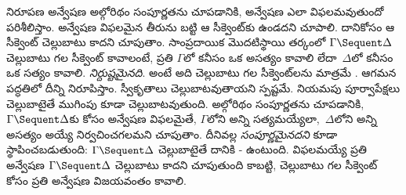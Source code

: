 \documentclass[../../../include/open-logic-section]{subfiles}
\begin{document}
నిరూపణ అన్వేషణ అల్గోరిథం సంపూర్ణతను చూపడానికి, అన్వేషణ ఎలా విఫలమవుతుందో పరిశీలిస్తాం. అన్వేషణ విఫలమైన తీరును బట్టి ఆ సీక్వెంట్‌కు  ఉండదని చూపాలి. దానికోసం ఆ సీక్వెంట్ చెల్లుబాటు కాదని చూపుతాం. సాంప్రదాయిక మొదటిస్థాయి తర్కంలో $\Gamma \Sequent \Delta$ చెల్లుబాటు గల సీక్వెంట్ కావాలంటే, ప్రతి  $\Gamma$లో కనీసం ఒక  అసత్యం కావాలి లేదా~$\Delta$లో కనీసం ఒక  సత్యం కావాలి.  \emph{నిర్దుష్టమైనది}. అంటే అది చెల్లుబాటు గల సీక్వెంట్‌లను మాత్రమే .  ఆగమన పద్ధతిలో దీన్ని నిరూపిస్తాం. స్వీకృతాలు చెల్లుబాటవుతాయని స్పష్టమే. నియమపు పూర్వాపేక్షలు చెల్లుబాటైతే ముగింపు కూడా చెల్లుబాటవుతుంది. అల్గోరిథం సంపూర్ణతను చూపడానికి, $\Gamma \Sequent \Delta$కు  కోసం అన్వేషణ విఫలమైతే, $\Gamma$లోని అన్ని  సత్యమయ్యేలా,~$\Delta$లోని అన్ని  అసత్యం అయ్యే  నిర్వచించగలమని చూపుతాం. దీనివల్ల  \emph{సంపూర్ణమైనదని} కూడా స్థాపించబడుతుంది: $\Gamma \Sequent \Delta$ చెల్లుబాటైతే దానికి - ఉంటుంది. విఫలమయ్యే ప్రతి అన్వేషణ $\Gamma \Sequent \Delta$ చెల్లుబాటు కాదని చూపుతుంది కాబట్టి, చెల్లుబాటు గల సీక్వెంట్ కోసం ప్రతి అన్వేషణ విజయవంతం కావాలి.
\end{document}

